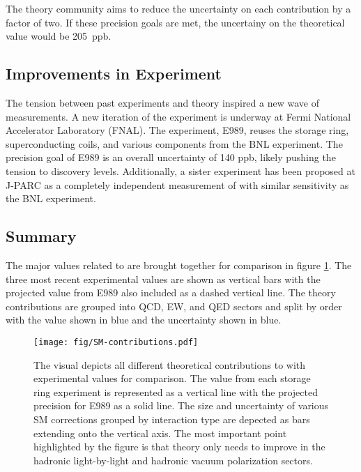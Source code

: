 The theory community aims to reduce the uncertainty on each contribution by a factor of two.  If these precision goals are met, the uncertainy on the theoretical value would be \SI{205}{ppb}.

\subsection{Improvements in Experiment}
The tension between past experiments and theory inspired a new wave of \mugmtwo measurements.  A new iteration of the \mugmtwo experiment is underway at Fermi National Accelerator Laboratory (FNAL). The experiment, E989, reuses the storage ring, superconducting coils, and various components from the BNL experiment.  The precision goal of E989 is an overall uncertainty of 140 ppb, likely pushing the tension to discovery levels. Additionally, a sister experiment has been proposed at J-PARC as a completely independent measurement of \mugmtwo with similar sensitivity as the BNL experiment.

\subsection{Summary}
The major values related to \mugmtwo are brought together for comparison in figure \ref{fig:sm-contributions}.  The three most recent experimental values are shown as vertical bars with the projected value from E989 also included as a dashed vertical line.  The theory contributions are grouped into QCD, EW, and QED sectors and split by order with the value shown in blue and the uncertainty shown in blue.

\begin{figure}
\label{fig:sm-contributions}
\centering
\texttt{[image: fig/SM-contributions.pdf]}
\caption{The visual depicts all different theoretical contributions to \mugmtwo with experimental values for comparison.  The value from each storage ring experiment is represented as a vertical line with the projected precision for E989 as a solid line.  The size and uncertainty of various SM corrections grouped by interaction type are depected as bars extending onto the vertical axis. The most important point highlighted by the figure is that theory only needs to improve in the hadronic light-by-light and hadronic vacuum polarization sectors.}
\end{figure}
